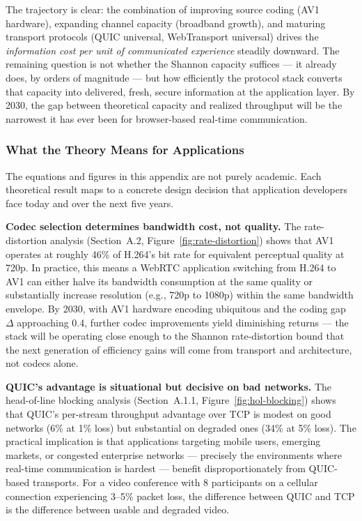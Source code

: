 The trajectory is clear: the combination of improving source coding
(AV1 hardware), expanding channel capacity (broadband growth), and
maturing transport protocols (QUIC universal, WebTransport universal)
drives the \emph{information cost per unit of communicated experience}
steadily downward. The remaining question is not whether the
Shannon capacity suffices --- it already does, by orders of magnitude
--- but how efficiently the protocol stack converts that capacity into
delivered, fresh, secure information at the application layer. By
2030, the gap between theoretical capacity and realized throughput will
be the narrowest it has ever been for browser-based real-time
communication.

\subsubsection{What the Theory Means for Applications}

The equations and figures in this appendix are not purely academic. Each
theoretical result maps to a concrete design decision that application
developers face today and over the next five years.

\textbf{Codec selection determines bandwidth cost, not quality.}
The rate-distortion analysis (Section~A.2, Figure~\ref{fig:rate-distortion})
shows that AV1 operates at roughly 46\% of H.264's bit rate for equivalent
perceptual quality at 720p. In practice, this means a WebRTC application
switching from H.264 to AV1 can either halve its bandwidth consumption at
the same quality or substantially increase resolution (e.g., 720p to 1080p)
within the same bandwidth envelope. By 2030, with AV1 hardware encoding
ubiquitous and the coding gap $\Delta$ approaching 0.4, further codec
improvements yield diminishing returns --- the stack will be operating close
enough to the Shannon rate-distortion bound that the next generation of
efficiency gains will come from transport and architecture, not codecs alone.

\textbf{QUIC's advantage is situational but decisive on bad networks.}
The head-of-line blocking analysis (Section~A.1.1,
Figure~\ref{fig:hol-blocking}) shows that QUIC's per-stream throughput
advantage over TCP is modest on good networks (6\% at 1\% loss) but
substantial on degraded ones (34\% at 5\% loss). The practical implication
is that applications targeting mobile users, emerging markets, or congested
enterprise networks --- precisely the environments where real-time
communication is hardest --- benefit disproportionately from QUIC-based
transports. For a video conference with 8 participants on a cellular
connection experiencing 3--5\% packet loss, the difference between QUIC and
TCP is the difference between usable and degraded video.

